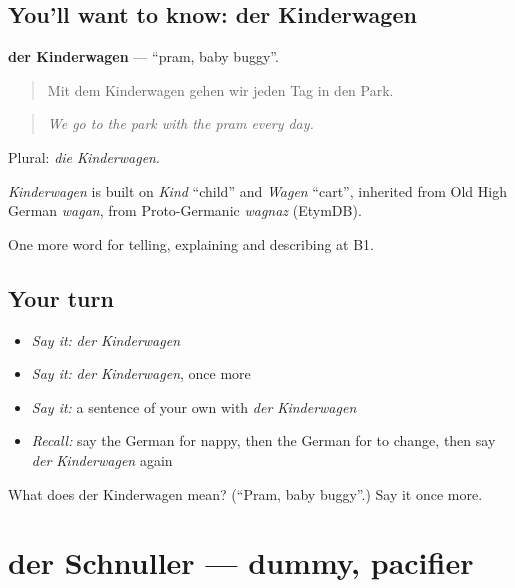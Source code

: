 \subsection*{You'll want to know: der Kinderwagen}
\textbf{der Kinderwagen} — \textquotedblleft{}pram, baby buggy\textquotedblright{}.

\begin{quote}
Mit dem Kinderwagen gehen wir jeden Tag in den Park.
\end{quote}

\begin{quote}
\emph{We go to the park with the pram every day.}
\end{quote}

Plural: \emph{die Kinderwagen}.

\begin{cousinweb}
\emph{Kinderwagen} is built on \emph{Kind} \textquotedblleft{}child\textquotedblright{} and \emph{Wagen} \textquotedblleft{}cart\textquotedblright{}, inherited from Old High German \emph{wagan}, from Proto-Germanic \emph{wagnaz} (EtymDB).
\end{cousinweb}

\begin{grammarlens}[title={What you've built}]
One more word for telling, explaining and describing at B1.
\end{grammarlens}

\subsection*{Your turn}
\begin{itemize}
\raggedright
  \item \emph{Say it:} \emph{der Kinderwagen}
  \item \emph{Say it:} \emph{der Kinderwagen}, once more
  \item \emph{Say it:} a sentence of your own with \emph{der Kinderwagen}
  \item \emph{Recall:} say the German for nappy, then the German for to change, then say \emph{der Kinderwagen} again
\end{itemize}

\begin{tcolorbox}[breakable,colback=teal!4,colframe=teal!35!black,title={Before you move on}]
What does der Kinderwagen mean? (\textquotedblleft{}Pram, baby buggy\textquotedblright{}.) Say it once more.
\end{tcolorbox}
\section[der Schnuller]{der Schnuller — dummy, pacifier}

